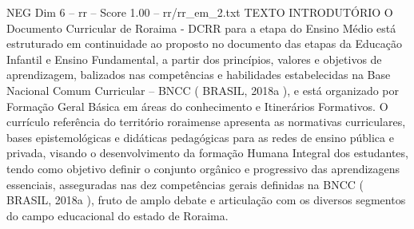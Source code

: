 \begin{textsample}{NEG Dim 6 – rr – Score 1.00 – rr/rr\_em\_2.txt}  \label{ex:f6_neg_079}
TEXTO INTRODUTÓRIO O Documento Curricular de Roraima - DCRR para a etapa do Ensino Médio está estruturado em continuidade ao proposto no documento das etapas da Educação Infantil e Ensino Fundamental, a partir dos princípios, valores e objetivos de aprendizagem, balizados nas competências e habilidades estabelecidas na Base Nacional Comum Curricular – BNCC ( BRASIL, 2018a ), e está organizado por Formação Geral Básica em áreas do conhecimento e Itinerários Formativos.
O currículo referência do território roraimense apresenta as normativas curriculares, bases epistemológicas e didáticas pedagógicas para as redes de ensino pública e privada, visando o desenvolvimento da formação Humana Integral dos estudantes, tendo como objetivo definir o conjunto orgânico e progressivo das aprendizagens essenciais, asseguradas nas dez competências gerais definidas na BNCC ( BRASIL, 2018a ), fruto de amplo debate e articulação com os diversos segmentos do campo educacional do estado de Roraima.

\end{textsample}
